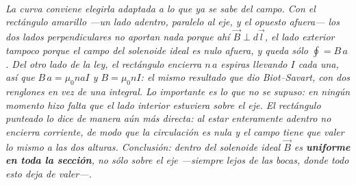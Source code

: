 \begin{center}
\begin{tikzpicture}[scale=1]
\end{tikzpicture}\\[0.5em]
{\small\itshape La curva conviene elegirla adaptada a lo que ya se sabe del
campo. Con el rectángulo amarillo ---un lado adentro, paralelo al eje, y el
opuesto afuera--- los dos lados perpendiculares no aportan nada porque ahí
$\vec B\perp d\vec l$, el lado exterior tampoco porque el campo del solenoide
ideal es nulo afuera, y queda sólo $\oint = B\,a$. Del otro lado de la ley, el
rectángulo encierra $n\,a$ espiras llevando $I$ cada una, así que
$B\,a = \mu_0 n a I$ y $B = \mu_0 n I$: el mismo resultado que dio
Biot--Savart, con dos renglones en vez de una integral. Lo importante es lo que
\emph{no} se supuso: en ningún momento hizo falta que el lado interior estuviera
sobre el eje. El rectángulo punteado lo dice de manera aún más directa: al estar
enteramente adentro no encierra corriente, de modo que la circulación es nula y
el campo tiene que valer lo mismo a las dos alturas. Conclusión: dentro del
solenoide ideal $\vec B$ es \textbf{uniforme en toda la sección}, no sólo sobre
el eje ---siempre lejos de las bocas, donde todo esto deja de valer---.}
\end{center}
